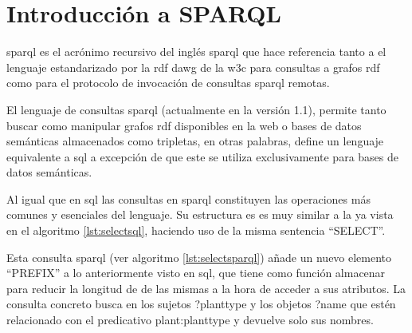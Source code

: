 \section{Introducción a SPARQL}

\acrshort{sparql}\cite{SPARQL_language} es el acrónimo recursivo del inglés \acrlong{sparql} que hace referencia tanto a el lenguaje estandarizado por la \acrshort{rdf} \acrshort{dawg} de la \acrshort{w3c}\cite{W3C} para consultas a grafos \acrshort{rdf} como para el protocolo de invocación de consultas \acrshort{sparql} remotas.

El lenguaje de consultas \acrshort{sparql} (actualmente en la versión 1.1), permite tanto buscar como manipular grafos \acrshort{rdf} disponibles en la web o bases de datos semánticas almacenados como tripletas, en otras palabras, define un lenguaje equivalente a \acrshort{sql} a excepción de que este se utiliza exclusivamente para bases de datos semánticas.

Al igual que en \acrshort{sql} las consultas en \acrshort{sparql} constituyen las operaciones más comunes y esenciales del lenguaje. Su estructura es es muy similar a la ya vista en el algoritmo \ref{lst:selectsql}, haciendo uso de la misma sentencia ``SELECT''.



Esta consulta \acrshort{sparql} (ver algoritmo \ref{lst:selectsparql}) añade un nuevo elemento ``PREFIX'' a lo anteriormente visto en \acrshort{sql}, que tiene como función almacenar  para reducir la longitud de de las mismas a la hora de acceder a sus atributos. La consulta concreto busca en los sujetos ?planttype y los objetos ?name que estén relacionado con el predicativo plant:planttype y devuelve solo sus nombres.